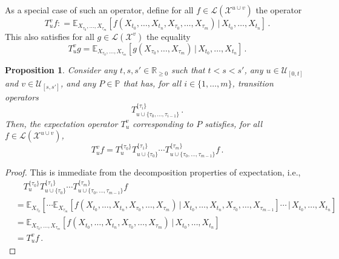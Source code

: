 \documentclass[10pt]{paper}
\newtheorem{proposition}[theorem]{Proposition}
\newcommand{\reals}{\mathbb{R}}
\newcommand{\realsnonneg}{\reals_{\geq 0}}
\newcommand{\states}{\mathcal{X}}
\newcommand{\gambles}{\mathcal{L}}
\newcommand{\coloneqq}{:\!=}
\begin{document}
As a special case of such an operator, define for all $f\in\gambles(\states^{u\cup v})$ the operator
\begin{equation*}
T_u^vf \coloneqq \mathbb{E}_{X_{\tau_0},\ldots,X_{\tau_m}}\left[f(X_{t_0},\ldots,X_{t_n},X_{\tau_0},\ldots,X_{\tau_m})\,\vert\,X_{t_0},\ldots,X_{t_n}\right]\,.
\end{equation*}
This also satisfies for all $g\in\gambles(\states^v)$ the equality
\begin{equation*}
T_u^vg = \mathbb{E}_{X_{\tau_0},\ldots,X_{\tau_m}}\left[g(X_{\tau_0},\ldots,X_{\tau_m})\,\vert\,X_{t_0},\ldots,X_{t_n}\right]\,.
\end{equation*}

\begin{proposition}\label{proposition:nonmarkov_multi_variable_decompose}
Consider any $t,s,s'\in\realsnonneg$ such that $t<s<s'$, any $u\in\mathcal{U}_{[0,t]}$ and $v\in\mathcal{U}_{[s,s']}$, and any $P\in\mathbb{P}$ that has, for all $i\in\{1,\ldots,m\}$, transition operators
\begin{equation*}
T_{u\cup\{\tau_0,\ldots,\tau_{i-1}\}}^{\{\tau_i\}}\,.
\end{equation*}
Then, the expectation operator $T_u^v$ corresponding to $P$ satisfies, for all $f\in\gambles(\states^{u\cup v})$,
\begin{equation*}
T_u^v f = T_u^{\{\tau_0\}}T_{u\cup\{\tau_0\}}^{\{\tau_1\}}\cdots T_{u\cup\{\tau_0,\ldots,\tau_{m-1}\}}^{\{\tau_m\}} f\,.
\end{equation*}
\end{proposition}
\begin{proof}
This is immediate from the decomposition properties of expectation, i.e.,
\begin{align*}
&\quad T_u^{\{\tau_0\}}T_{u\cup\{\tau_0\}}^{\{\tau_1\}}\cdots T_{u\cup\{\tau_0,\ldots,\tau_{m-1}\}}^{\{\tau_m\}} f \\
 &= \mathbb{E}_{X_{\tau_0}}\left[\cdots\mathbb{E}_{X_{\tau_m}}\left[f(X_{t_0},\ldots,X_{t_n},X_{\tau_0},\ldots,X_{\tau_m})\,\vert\,X_{t_0},\ldots,X_{t_n},X_{\tau_0},\ldots,X_{\tau_{m-1}}\right]\cdots\,\vert\,X_{t_0},\ldots,X_{t_n}\right] \\
 &= \mathbb{E}_{X_{\tau_0},\ldots,X_{\tau_m}}\left[f(X_{t_0},\ldots,X_{t_n},X_{\tau_0},\ldots,X_{\tau_m})\,\vert\,X_{t_0},\ldots,X_{t_n}\right] \\
 &= T_u^v f\,.
\end{align*}
\end{proof}
\end{document}
